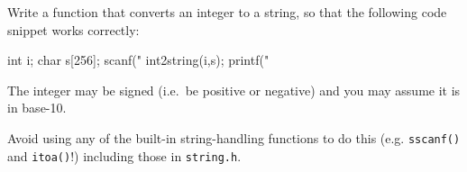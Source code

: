 
\begin{exercise}
Write a function that converts an integer
to a string, so that the following code snippet
works correctly:

\begin{codesnippet}
int i;
char s[256];
scanf("%
int2string(i,s);
printf("%
\end{codesnippet}

The integer may be signed (i.e.\ be positive or negative)
and you may assume it is in base-10.

Avoid using any of the built-in string-handling functions
to do this (e.g. \verb^sscanf()^ and \verb^itoa()^!) 
including those in \verb^string.h^.
\end{exercise}

